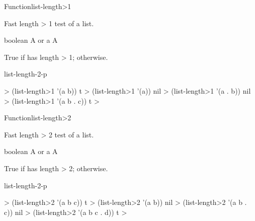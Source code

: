 \documentclass[10pt,twoside,english,pdftex]{article}
\begin{document}
\begin{functiondoc}{Function}{list-length>1}{%
    }
%
%

\fnsyntax

\fnpurpose Fast length > 1 test of a list.

\fnpackage {}

\fnmodule {}

\fnargs
\begin{args}{boolean}
\arg[list] A  or a 
\arg[boolean] A 
\end{args}

\fnreturns True if  has length > 1; \nil{} otherwise.

\begin{alsos}{list-length-2-p}
\end{alsos}

\fnexamples
%
\W\supp
\begin{example}
  > (list-length>1 '(a b))
  t
  > (list-length>1 '(a))
  nil\goodpagebreak
  > (list-length>1 '(a . b))
  nil
  > (list-length>1 '(a b . c))
  t
  >
\end{example}

\end{functiondoc}


\begin{functiondoc}{Function}{list-length>2}{%
    }
%
%

\fnsyntax

\fnpurpose Fast length > 2 test of a list.

\fnpackage {}

\fnmodule {}

\fnargs
\begin{args}{boolean}
\arg[list] A  or a 
\arg[boolean] A 
\end{args}

\fnreturns True if  has length > 2; \nil{} otherwise.

\begin{alsos}{list-length-2-p}
\end{alsos}

\fnexamples
%
\W\supp
\begin{example}
  > (list-length>2 '(a b c))
  t
  > (list-length>2 '(a b))
  nil\goodpagebreak
  > (list-length>2 '(a b . c))
  nil
  > (list-length>2 '(a b c . d))
  t
  >
\end{example}

\end{functiondoc}
\end{document}
